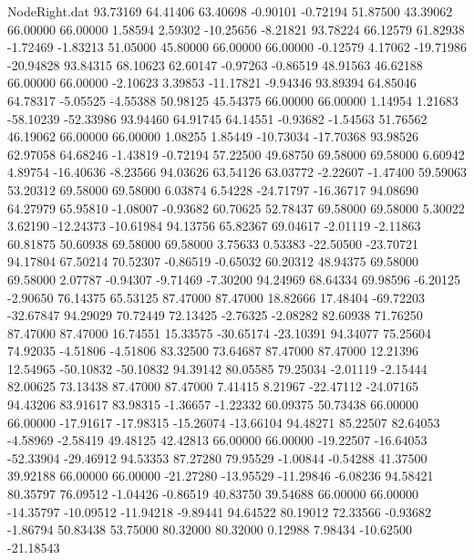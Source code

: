 \begin{filecontents}{NodeRight.dat}
  93.73169   64.41406   63.40698    -0.90101   -0.72194   51.87500   43.39062   66.00000   66.00000    1.58594    2.59302  -10.25656   -8.21821
  93.78224   66.12579   61.82938    -1.72469   -1.83213   51.05000   45.80000   66.00000   66.00000   -0.12579    4.17062  -19.71986  -20.94828
  93.84315   68.10623   62.60147    -0.97263   -0.86519   48.91563   46.62188   66.00000   66.00000   -2.10623    3.39853  -11.17821   -9.94346
  93.89394   64.85046   64.78317    -5.05525   -4.55388   50.98125   45.54375   66.00000   66.00000    1.14954    1.21683  -58.10239  -52.33986
  93.94460   64.91745   64.14551    -0.93682   -1.54563   51.76562   46.19062   66.00000   66.00000    1.08255    1.85449  -10.73034  -17.70368
  93.98526   62.97058   64.68246    -1.43819   -0.72194   57.22500   49.68750   69.58000   69.58000    6.60942    4.89754  -16.40636   -8.23566
  94.03626   63.54126   63.03772    -2.22607   -1.47400   59.59063   53.20312   69.58000   69.58000    6.03874    6.54228  -24.71797  -16.36717
  94.08690   64.27979   65.95810    -1.08007   -0.93682   60.70625   52.78437   69.58000   69.58000    5.30022    3.62190  -12.24373  -10.61984
  94.13756   65.82367   69.04617    -2.01119   -2.11863   60.81875   50.60938   69.58000   69.58000    3.75633    0.53383  -22.50500  -23.70721
  94.17804   67.50214   70.52307    -0.86519   -0.65032   60.20312   48.94375   69.58000   69.58000    2.07787   -0.94307   -9.71469   -7.30200
  94.24969   68.64334   69.98596    -6.20125   -2.90650   76.14375   65.53125   87.47000   87.47000   18.82666   17.48404  -69.72203  -32.67847
  94.29029   70.72449   72.13425    -2.76325   -2.08282   82.60938   71.76250   87.47000   87.47000   16.74551   15.33575  -30.65174  -23.10391
  94.34077   75.25604   74.92035    -4.51806   -4.51806   83.32500   73.64687   87.47000   87.47000   12.21396   12.54965  -50.10832  -50.10832
  94.39142   80.05585   79.25034    -2.01119   -2.15444   82.00625   73.13438   87.47000   87.47000    7.41415    8.21967  -22.47112  -24.07165
  94.43206   83.91617   83.98315    -1.36657   -1.22332   60.09375   50.73438   66.00000   66.00000  -17.91617  -17.98315  -15.26074  -13.66104
  94.48271   85.22507   82.64053    -4.58969   -2.58419   49.48125   42.42813   66.00000   66.00000  -19.22507  -16.64053  -52.33904  -29.46912
  94.53353   87.27280   79.95529    -1.00844   -0.54288   41.37500   39.92188   66.00000   66.00000  -21.27280  -13.95529  -11.29846   -6.08236
  94.58421   80.35797   76.09512    -1.04426   -0.86519   40.83750   39.54688   66.00000   66.00000  -14.35797  -10.09512  -11.94218   -9.89441
  94.64522   80.19012   72.33566    -0.93682   -1.86794   50.83438   53.75000   80.32000   80.32000    0.12988    7.98434  -10.62500  -21.18543

\end{filecontents}
